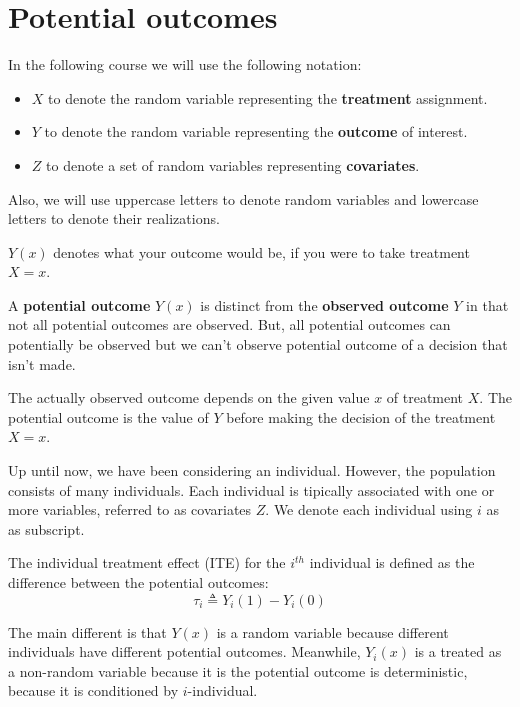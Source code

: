 \chapter{Potential outcomes}
In the following course we will use the following notation:
\begin{itemize}
    \item $X$ to denote the random variable representing the \textbf{treatment}
          assignment.
    \item $Y$ to denote the random variable representing the \textbf{outcome} of
          interest.
    \item $Z$ to denote a set of random variables representing \textbf{covariates}.
\end{itemize}

Also, we will use uppercase letters to denote random variables and lowercase
letters to denote their realizations.

\begin{definition}
    $Y(x)$ denotes what your outcome would be, if you were to take treatment $X = x$.
\end{definition}
A \textbf{potential outcome} $Y(x)$ is distinct from the \textbf{observed outcome} $Y$ in that not
all potential outcomes are observed. But, all potential outcomes can potentially
be observed but we can't observe potential outcome of a decision that isn't made.

The actually observed outcome depends on the given value $x$ of treatment $X$.
The potential outcome is the value of $Y$ before making the decision of the
treatment $X=x$.

Up until now, we have been considering an individual. However, the population
consists of many individuals. Each individual is tipically associated with one or
more variables, referred to as covariates $Z$. We denote each individual using $i$
as as subscript.

\begin{definition}
    The individual treatment effect (ITE) for the $i^{th}$ individual
    is defined as the difference between the potential outcomes:
    \begin{equation}
        \tau_i \triangleq Y_i(1) - Y_i(0)
    \end{equation}

    The main different is that $Y(x)$ is a random variable because different individuals
    have different potential outcomes. Meanwhile, $Y_i(x)$ is a treated as a
    non-random variable because it is the potential outcome is deterministic, because
    it is conditioned by $i$-individual.
\end{definition}

